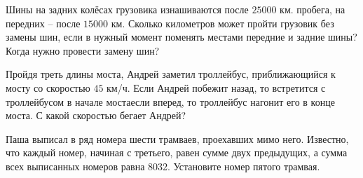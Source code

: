 ﻿
\begin{itemize}

\itA Шины на задних колёсах грузовика изнашиваются после $25 000$ км. пробега, на передних -- после $15 000$ км. Сколько километров может пройти грузовик без замены шин, если в нужный момент поменять местами передние и задние шины? Когда нужно провести замену шин?

\itB Пройдя треть длины моста, Андрей заметил троллейбус, приближающийся к мосту со скоростью $45$ км/ч. Если Андрей побежит назад, то встретится с троллейбусом в начале моста\scolon если вперед, то троллейбус нагонит его в конце моста. С какой скоростью бегает Андрей?

\itC Паша выписал в ряд номера шести трамваев, проехавших мимо него. Известно, что каждый номер, начиная с третьего, равен сумме двух предыдущих, а сумма всех выписанных номеров равна 8032. Установите номер пятого трамвая.
\end{itemize}